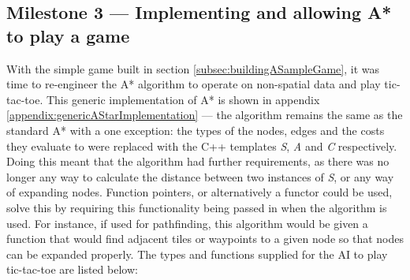 \documentclass[11pt, a4paper]{report}
\begin{document}
\subsection[Implementing and allowing A* to play a game]{Milestone 3 --- Implementing and allowing A* to play a game}
\label{subsec:implementingAndAllowingAStarToPlay}

With the simple game built in section \ref{subsec:buildingASampleGame}, it was time to re-engineer the A* algorithm to operate on non-spatial data and play tic-tac-toe. This generic implementation of A* is shown in appendix \ref{appendix:genericAStarImplementation} --- the algorithm remains the same as the standard A* with a one exception: the types of the nodes, edges and the costs they evaluate to were replaced with the C++ templates \emph{S}, \emph{A} and \emph{C} respectively. Doing this meant that the algorithm had further requirements, as there was no longer any way to calculate the distance between two instances of \emph{S}, or any way of expanding nodes. Function pointers, or alternatively a functor could be used, solve this by requiring this functionality being passed in when the algorithm is used. For instance, if used for pathfinding, this algorithm would be given a function that would find adjacent tiles or waypoints to a given node so that nodes can be expanded properly. The types and functions supplied for the AI to play tic-tac-toe are listed below:
\end{document}
